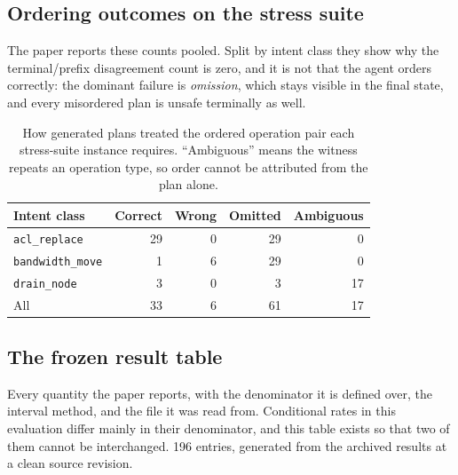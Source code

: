 \subsection{Ordering outcomes on the stress suite}
\label{supp:ordering}

The paper reports these counts pooled. Split by intent class they show why
the terminal/prefix disagreement count is zero, and it is not that the agent
orders correctly: the dominant failure is \emph{omission}, which stays
visible in the final state, and every misordered plan is unsafe terminally
as well.

\begin{table}[h]
\centering
\caption{How generated plans treated the ordered operation pair each
stress-suite instance requires. ``Ambiguous'' means the witness repeats an
operation type, so order cannot be attributed from the plan alone.}
\label{tab:supp-ordering}
\footnotesize
\begin{tabular}{lrrrr}
\toprule
Intent class & Correct & Wrong & Omitted & Ambiguous\\
\midrule
\texttt{acl\_replace} & 29 & 0 & 29 & 0 \\
\texttt{bandwidth\_move} & 1 & 6 & 29 & 0 \\
\texttt{drain\_node} & 3 & 0 & 3 & 17 \\
\midrule
All & 33 & 6 & 61 & 17 \\
\bottomrule
\end{tabular}
\end{table}


\subsection{The frozen result table}
\label{supp:frozen}

Every quantity the paper reports, with the denominator it is defined over,
the interval method, and the file it was read from. Conditional rates in
this evaluation differ mainly in their denominator, and this table exists so
that two of them cannot be interchanged. 196 entries,
generated from the archived results at a clean source revision.

